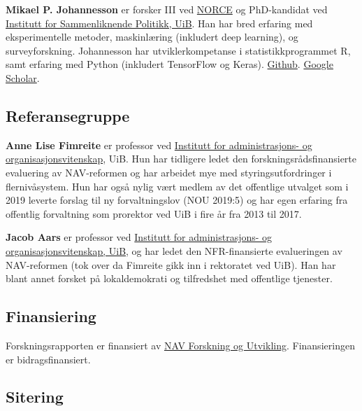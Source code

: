 \documentclass[
  12pt,
  a4paper, 12pt]{article}
\begin{document}
\textbf{Mikael P. Johannesson} er forsker III ved \href{https://www.norceresearch.no/personer/sveinung-arnesen}{NORCE} og PhD-kandidat ved \href{https://www.uib.no/sampol}{Institutt for Sammenliknende Politikk, UiB}.
Han har bred erfaring med eksperimentelle metoder, maskinlæring (inkludert deep learning), og surveyforskning.
Johannesson har utviklerkompetanse i statistikkprogrammet R, samt erfaring med Python (inkludert TensorFlow og Keras). \href{https://github.com/mikajoh}{Github}. \href{https://scholar.google.com/citations?user=wG8CyVUAAAAJ\&hl=no\&oi=ao}{Google Scholar}.

\hypertarget{referansegruppe}{%
\subsection*{Referansegruppe}\label{referansegruppe}}

\textbf{Anne Lise Fimreite} er professor ved \href{https://www.uib.no/personer/Anne.Lise.Fimreite}{Institutt for administrasjons- og organisasjonsvitenskap}, UiB.
Hun har tidligere ledet den forskningsrådsfinansierte evaluering av NAV-reformen og har arbeidet mye med styringsutfordringer i flernivåsystem.
Hun har også nylig vært medlem av det offentlige utvalget som i 2019 leverte forslag til ny forvaltningslov (NOU 2019:5) og har egen erfaring fra offentlig forvaltning som prorektor ved UiB i fire år fra 2013 til 2017.

\textbf{Jacob Aars} er professor ved \href{https://www.uib.no/personer/Jacob.Aars}{Institutt for administrasjons- og organisasjonsvitenskap, UiB}, og har ledet den NFR-finansierte evalueringen av NAV-reformen (tok over da Fimreite gikk inn i rektoratet ved UiB).
Han har blant annet forsket på lokaldemokrati og tilfredshet med offentlige tjenester.

\hypertarget{finansiering}{%
\subsection*{Finansiering}\label{finansiering}}

Forskningsrapporten er finansiert av \href{https://www.nav.no/no/nav-og-samfunn/kunnskap/fou-midler/pagaende-fou-prosjekter2/navs-tiltak-og-virkemidler}{NAV Forskning og Utvikling}.
Finansieringen er bidragsfinansiert.

\hypertarget{sitering}{%
\subsection*{Sitering}\label{sitering}}
\end{document}
